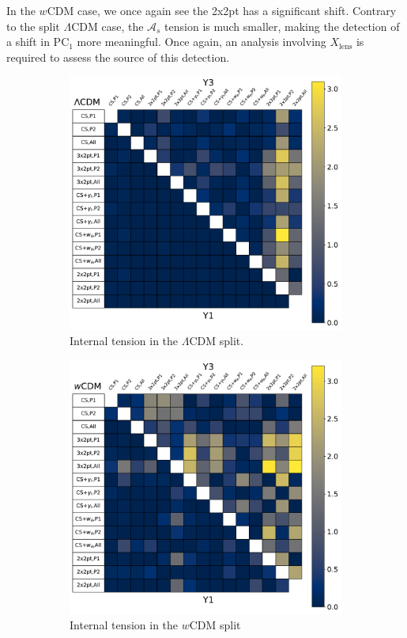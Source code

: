In the $w$CDM case, we once again see the 2x2pt has a significant shift. Contrary to the split $\Lambda$CDM case, the $\mathcal{A}_s$ tension is much smaller, making the detection of a shift in $\mathrm{PC}_1$ more meaningful. Once again, an analysis involving $X_\mathrm{lens}$ is required to assess the source of this detection.
\begin{figure}[ht]
	\centering
	\begin{subfigure}[b]{0.45\textwidth}
		\includegraphics[width=\textwidth]{plots/internal_tension_v4.pdf}
		\caption{Internal tension in the $\Lambda$CDM split.}
		\label{fig:lcdm_tension}
	\end{subfigure}
	\begin{subfigure}[b]{0.45\textwidth}
		\includegraphics[width=\textwidth]{plots/internal_tension_wcdm.pdf}
		\caption{Internal tension in the $w$CDM split}
		\label{fig:wcdm_tension}
	\end{subfigure}
	\caption{}
	\label{fig:tension}
\end{figure}
